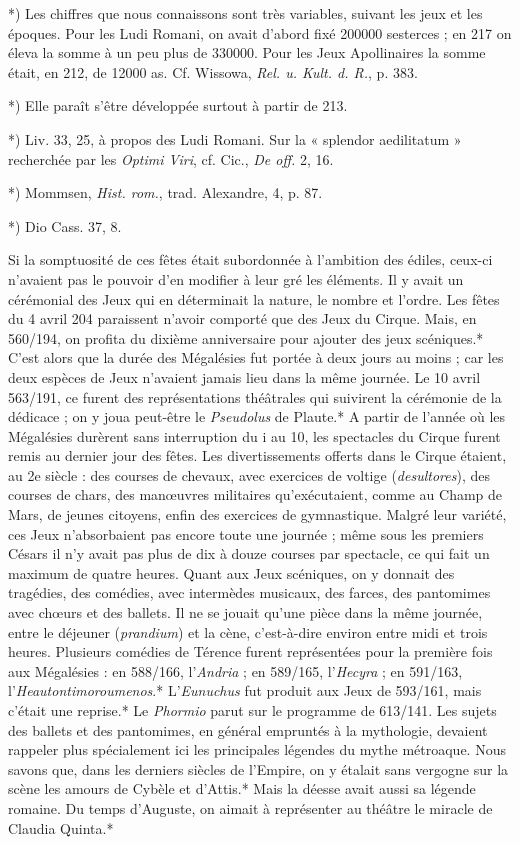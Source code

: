 \documentclass[a4paper, 11pt, oneside, polutonikogreek, french]{article}
\begin{document}
*) Les chiffres que nous connaissons sont très variables, suivant les jeux et les époques. Pour les Ludi Romani, on avait d'abord fixé 200000 sesterces ; en 217 on éleva la somme à un peu plus de 330000. Pour les Jeux Apollinaires la somme était, en 212, de 12000 as. Cf. Wissowa, \emph{Rel. u. Kult. d. R.}, p. 383.

*) Elle paraît s'être développée surtout à partir de 213.

*) Liv. 33, 25, à propos des Ludi Romani. Sur la « splendor aedilitatum » recherchée par les \emph{Optimi Viri}, cf. Cic., \emph{De off.} 2, 16.

*) Mommsen, \emph{Hist. rom.}, trad. Alexandre, 4, p. 87.

*) Dio Cass. 37, 8.

Si la somptuosité de ces fêtes était subordonnée à l'ambition des édiles, ceux-ci n'avaient pas le pouvoir d'en modifier à leur gré les éléments. Il y avait un cérémonial des Jeux qui en déterminait la nature, le nombre et l'ordre. Les fêtes du 4 avril 204 paraissent n'avoir comporté que des Jeux du Cirque. Mais, en 560/194, on profita du dixième anniversaire pour ajouter des jeux scéniques.* C'est alors que la durée des Mégalésies fut portée à deux jours au moins ; car les deux espèces de Jeux n'avaient jamais lieu dans la même journée. Le 10 avril 563/191, ce furent des représentations théâtrales qui suivirent la cérémonie de la dédicace ; on y joua peut-être le \emph{Pseudolus} de Plaute.* A partir de l'année où les Mégalésies durèrent sans interruption du i au 10, les spectacles du Cirque furent remis au dernier jour des fêtes. Les divertissements offerts dans le Cirque étaient, au 2e siècle : des courses de chevaux, avec exercices de voltige (\emph{desultores}), des courses de chars, des manœuvres militaires qu'exécutaient, comme au Champ de Mars, de jeunes citoyens, enfin des exercices de gymnastique. Malgré leur variété, ces Jeux n'absorbaient pas encore toute une journée ; même sous les premiers Césars il n'y avait pas plus de dix à douze courses par spectacle, ce qui fait un maximum de quatre heures. Quant aux Jeux scéniques, on y donnait des tragédies, des comédies, avec intermèdes musicaux, des farces, des pantomimes avec chœurs et des ballets. Il ne se jouait qu'une pièce dans la même journée, entre le déjeuner (\emph{prandium}) et la cène, c'est-à-dire environ entre midi et trois heures. Plusieurs comédies de Térence furent représentées pour la première fois aux Mégalésies : en 588/166, l'\emph{Andria} ; en 589/165, l'\emph{Hecyra} ; en 591/163, l'\emph{Heautontimoroumenos}.* L'\emph{Eunuchus} fut produit aux Jeux de 593/161, mais c'était une reprise.* Le \emph{Phormio} parut sur le programme de 613/141. Les sujets des ballets et des pantomimes, en général empruntés à la mythologie, devaient rappeler plus spécialement ici les principales légendes du mythe métroaque. Nous savons que, dans les derniers siècles de l'Empire, on y étalait sans vergogne sur la scène les amours de Cybèle et d'Attis.* Mais la déesse avait aussi sa légende romaine. Du temps d'Auguste, on aimait à représenter au théâtre le miracle de Claudia Quinta.*
\end{document}
